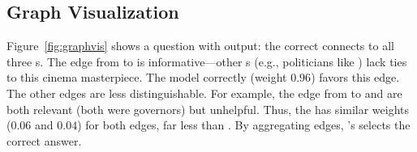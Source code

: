 \subsection{Graph Visualization}

Figure~\ref{fig:graphvis} shows a question with  output:
%
the correct \rightnode{} 
connects to all three \leftnode{}s.
%
The edge from  to  is
informative---other \rightnode{}s (e.g., politicians like
) lack ties to this cinema masterpiece.
%
The  model correctly (weight $0.96$) favors this edge.
%
The other edges are less distinguishable.
%
For example, the edge from  to
 and  are both
relevant (both were governors) but unhelpful.
%
Thus, the  has similar weights ($0.06$ and $0.04$) for
both edges, far less than .
%
By aggregating edges, \name{}'s  selects the correct
answer.



